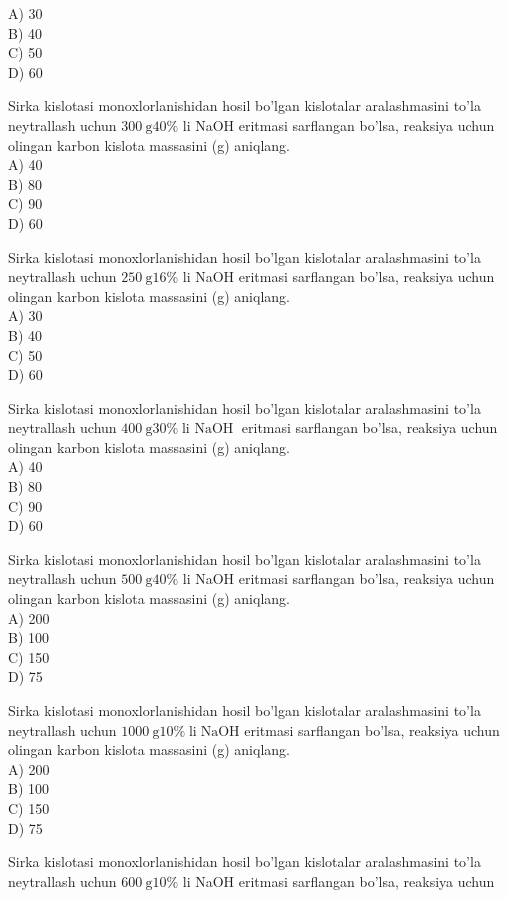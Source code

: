 A) 30\\
B) 40\\
C) 50\\
D) 60
  \item Sirka kislotasi monoxlorlanishidan hosil bo'lgan kislotalar aralashmasini to'la neytrallash uchun $300 \mathrm{~g} 40 \%$ li NaOH eritmasi sarflangan bo'lsa, reaksiya uchun olingan karbon kislota massasini (g) aniqlang.\\
A) 40\\
B) 80\\
C) 90\\
D) 60
  \item Sirka kislotasi monoxlorlanishidan hosil bo'lgan kislotalar aralashmasini to'la neytrallash uchun $250 \mathrm{~g} 16 \%$ li NaOH eritmasi sarflangan bo'lsa, reaksiya uchun olingan karbon kislota massasini (g) aniqlang.\\
A) 30\\
B) 40\\
C) 50\\
D) 60
  \item Sirka kislotasi monoxlorlanishidan hosil bo'lgan kislotalar aralashmasini to'la neytrallash uchun $400 \mathrm{~g} 30 \% \operatorname{li~NaOH}$ eritmasi sarflangan bo'lsa, reaksiya uchun olingan karbon kislota massasini (g) aniqlang.\\
A) 40\\
B) 80\\
C) 90\\
D) 60
  \item Sirka kislotasi monoxlorlanishidan hosil bo'lgan kislotalar aralashmasini to'la neytrallash uchun $500 \mathrm{~g} 40 \%$ li NaOH eritmasi sarflangan bo'lsa, reaksiya uchun olingan karbon kislota massasini (g) aniqlang.\\
A) 200\\
B) 100\\
C) 150\\
D) 75
  \item Sirka kislotasi monoxlorlanishidan hosil bo'lgan kislotalar aralashmasini to'la neytrallash uchun $1000 \mathrm{~g} 10 \% \operatorname{li} \mathrm{NaOH}$ eritmasi sarflangan bo'lsa, reaksiya uchun olingan karbon kislota massasini (g) aniqlang.\\
A) 200\\
B) 100\\
C) 150\\
D) 75
  \item Sirka kislotasi monoxlorlanishidan hosil bo'lgan kislotalar aralashmasini to'la neytrallash uchun $600 \mathrm{~g} 10 \%$ li NaOH eritmasi sarflangan bo'lsa, reaksiya uchun\\
